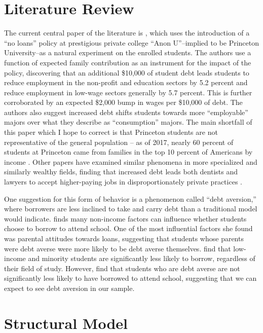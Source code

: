 \documentclass[12pt]{article}
\begin{document}
	\section{Literature Review}
	
	The current central paper of the literature is \textcite{rothstein2011}, which uses the introduction of a ``no loans'' policy at prestigious private college ``Anon U''--implied to be Princeton University--as a natural experiment on the enrolled students. The authors use a function of expected family contribution as an instrument for the impact of the policy, discovering that an additional \$10,000 of student debt leads students to reduce employment in the non-profit and education sectors by 5.2 percent and reduce employment in low-wage sectors generally by 5.7 percent. This is further corroborated by an expected \$2,000 bump in wages per \$10,000 of debt. The authors also suggest increased debt shifts students towards more ``employable'' majors over what they describe as ``consumption'' majors. The main shortfall of this paper which I hope to correct is that Princeton students are not representative of the general population -- as of 2017, nearly 60 percent of students at Princeton came from families in the top 10 percent of Americans by income \parencite{aisch2017}. Other papers have examined similar phenomena in more specialized and similarly wealthy fields, finding that increased debt leads both dentists and lawyers to accept higher-paying jobs in disproportionately private practices \parencite{nicholson2015, field2009}.
	
	One suggestion for this form of behavior is a phenomenon called ``debt aversion,'' where borrowers are less inclined to take and carry debt than a traditional model would indicate. \textcite{burdman2005} finds many non-income factors can influence whether students choose to borrow to attend school. One of the most influential factors she found was parental attitudes towards loans, suggesting that students whose parents were debt averse were more likely to be debt averse themselves. \textcite{callender2005} find that low-income and minority students are significantly less likely to borrow, regardless of their field of study. However, \textcite{eckel2007} find that students who are debt averse are not significantly less likely to have borrowed to attend school, suggesting that we can expect to see debt aversion in our sample. 

	\section{Structural Model}
	
\end{document}
